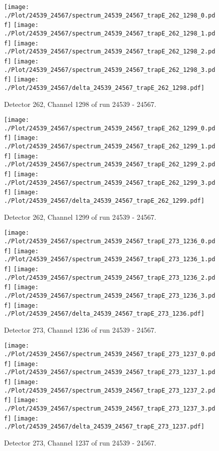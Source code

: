 \clearpage
\begin{figure}[hb]
\centering
\texttt{[image: ./Plot/24539\_24567/spectrum\_24539\_24567\_trapE\_262\_1298\_0.pdf]}
\texttt{[image: ./Plot/24539\_24567/spectrum\_24539\_24567\_trapE\_262\_1298\_1.pdf]}
\texttt{[image: ./Plot/24539\_24567/spectrum\_24539\_24567\_trapE\_262\_1298\_2.pdf]}
\texttt{[image: ./Plot/24539\_24567/spectrum\_24539\_24567\_trapE\_262\_1298\_3.pdf]}
\texttt{[image: ./Plot/24539\_24567/delta\_24539\_24567\_trapE\_262\_1298.pdf]}
\caption{ Detector 262, Channel 1298 of run 24539 - 24567.}
\label{fig:24539_24567_trapE_262_1298}
\end{figure}
\clearpage
\begin{figure}[hb]
\centering
\texttt{[image: ./Plot/24539\_24567/spectrum\_24539\_24567\_trapE\_262\_1299\_0.pdf]}
\texttt{[image: ./Plot/24539\_24567/spectrum\_24539\_24567\_trapE\_262\_1299\_1.pdf]}
\texttt{[image: ./Plot/24539\_24567/spectrum\_24539\_24567\_trapE\_262\_1299\_2.pdf]}
\texttt{[image: ./Plot/24539\_24567/spectrum\_24539\_24567\_trapE\_262\_1299\_3.pdf]}
\texttt{[image: ./Plot/24539\_24567/delta\_24539\_24567\_trapE\_262\_1299.pdf]}
\caption{ Detector 262, Channel 1299 of run 24539 - 24567.}
\label{fig:24539_24567_trapE_262_1299}
\end{figure}
\clearpage
\begin{figure}[hb]
\centering
\texttt{[image: ./Plot/24539\_24567/spectrum\_24539\_24567\_trapE\_273\_1236\_0.pdf]}
\texttt{[image: ./Plot/24539\_24567/spectrum\_24539\_24567\_trapE\_273\_1236\_1.pdf]}
\texttt{[image: ./Plot/24539\_24567/spectrum\_24539\_24567\_trapE\_273\_1236\_2.pdf]}
\texttt{[image: ./Plot/24539\_24567/spectrum\_24539\_24567\_trapE\_273\_1236\_3.pdf]}
\texttt{[image: ./Plot/24539\_24567/delta\_24539\_24567\_trapE\_273\_1236.pdf]}
\caption{ Detector 273, Channel 1236 of run 24539 - 24567.}
\label{fig:24539_24567_trapE_273_1236}
\end{figure}
\clearpage
\begin{figure}[hb]
\centering
\texttt{[image: ./Plot/24539\_24567/spectrum\_24539\_24567\_trapE\_273\_1237\_0.pdf]}
\texttt{[image: ./Plot/24539\_24567/spectrum\_24539\_24567\_trapE\_273\_1237\_1.pdf]}
\texttt{[image: ./Plot/24539\_24567/spectrum\_24539\_24567\_trapE\_273\_1237\_2.pdf]}
\texttt{[image: ./Plot/24539\_24567/spectrum\_24539\_24567\_trapE\_273\_1237\_3.pdf]}
\texttt{[image: ./Plot/24539\_24567/delta\_24539\_24567\_trapE\_273\_1237.pdf]}
\caption{ Detector 273, Channel 1237 of run 24539 - 24567.}
\label{fig:24539_24567_trapE_273_1237}
\end{figure}
